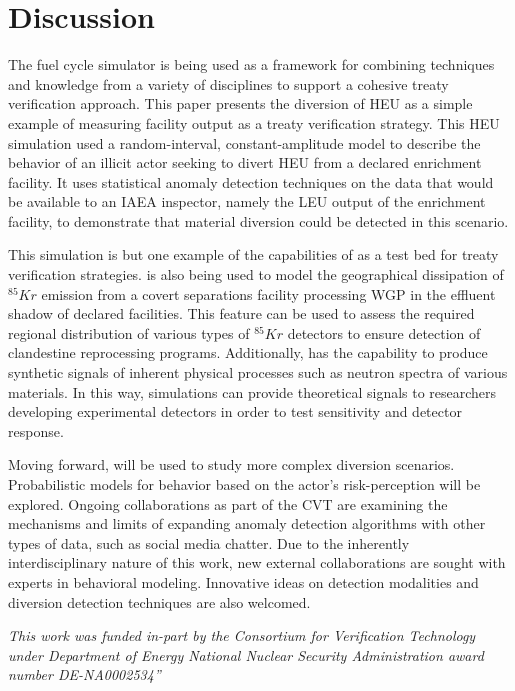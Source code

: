 \section{Discussion}
\label{s_dis}

The \Cyclus fuel cycle simulator is being used as a framework for combining techniques and knowledge from a variety of disciplines to support a cohesive treaty verification approach. This paper presents the diversion of \gls{HEU} as a simple example of measuring facility output as a treaty verification strategy.  This \gls{HEU} simulation used a random-interval, constant-amplitude model to describe the behavior of an illicit actor seeking to divert \gls{HEU} from a declared enrichment facility.  It uses statistical anomaly detection techniques on the data that would be available to an \gls{IAEA} inspector, namely the \gls{LEU} output of the enrichment facility, to demonstrate that material diversion could be detected in this scenario.

This simulation is but one example of the capabilities of \Cyclus as a test bed for treaty verification strategies.  \Cyclus is also being used to model the geographical dissipation of $^{85}Kr$ emission from a covert separations facility processing \gls{WGP} in the effluent shadow of declared facilities.  This feature can be used to assess the required regional distribution of various types of $^{85}Kr$ detectors to ensure detection of clandestine reprocessing programs.  Additionally, \Cyclus has the capability to produce synthetic signals of inherent physical processes such as neutron spectra of various materials.  In this way, \Cyclus simulations can provide theoretical signals to researchers developing experimental detectors in order to test sensitivity and detector response.

Moving forward, \Cyclus will be used to study more complex diversion scenarios.  Probabilistic models for behavior based on the actor's risk-perception will be explored.  Ongoing collaborations as part of the \gls{CVT} are examining the mechanisms and limits of expanding anomaly detection algorithms with other types of data, such as social media chatter.  Due to the inherently interdisciplinary nature of this work, new external collaborations are sought with experts in behavioral modeling. Innovative ideas on detection modalities and diversion detection techniques are also welcomed.



\textit{This work was funded in-part by the Consortium for Verification Technology under Department of Energy National Nuclear Security Administration award number DE-NA0002534”}
